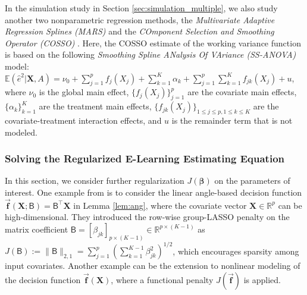 \documentclass[11pt]{article}
\theoremstyle{definition}
\theoremstyle{remark}
\newcommand{\bbf}{\bm{f}}
\newcommand{\bX}{\bm{X}}
\newcommand{\bbeta}{\bm{\beta}}
\newcommand{\bbE}{\mathbb{E}}
\newcommand{\bbR}{\mathbb{R}}
\newcommand{\sfB}{\mathsf{B}}
\begin{document}
In the simulation study in Section \ref{sec:simulation_multiple}, we also study another two nonparametric regression methods, the \textit{Multivariate Adaptive Regression Splines (MARS)} \citep{friedman1991multivariate} and the \textit{COmponent Selection and Smoothing Operator (COSSO)} \citep{lin2006component}. Here, the COSSO estimate of the working variance function is based on the following \textit{Smoothing Spline ANalysis Of VAriance (SS-ANOVA)} model: $ \bbE(\widehat{e}^{2}|\bX,A) = \nu_{0} + \sum_{j=1}^{p}f_{j}(X_{j}) + \sum_{k=1}^{K}\alpha_{k} + \sum_{j=1}^{p}\sum_{k=1}^{K}f_{jk}(X_{j}) + u $, where $ \nu_{0} $ is the global main effect, $ \{ f_{j}(X_{j}) \}_{j=1}^{p} $ are the covariate main effects, $ \{ \alpha_{k} \}_{k=1}^{K} $ are the treatment main effects, $ \{ f_{jk}(X_{j}) \}_{1 \le j \le p, 1 \le k \le K} $ are the covariate-treatment interaction effects, and $ u $ is the remainder term that is not modeled.

\subsubsection{Solving the Regularized E-Learning Estimating Equation}\label{sec:reg}
In this section, we consider further regularization $ J(\bbeta) $ on the parameters of interest. One example from \citet{qi2020multi} is to consider the linear angle-based decision function $ \vec{\bbf}(\bX;\sfB) = \sfB^{\intercal}\bX $ in Lemma \ref{lem:ang}, where the covariate vector $ \bX \in \bbR^{p} $ can be high-dimensional. They introduced the row-wise group-LASSO penalty on the matrix coefficient $ \sfB = [\beta_{jk}]_{p\times(K-1)} \in \bbR^{p\times(K-1)} $ as $ J(\sfB) := \|\sfB\|_{2,1} = \sum_{j=1}^{p}(\sum_{k=1}^{K-1}\beta_{jk}^{2})^{1/2} $, which encourages sparsity among input covariates. Another example can be the extension to nonlinear modeling of the decision function $ \vec{\bbf}(\bX) $, where a functional penalty $ J(\vec{\bbf}) $ is applied.
\end{document}
